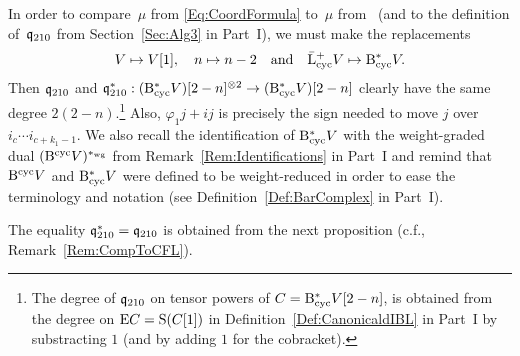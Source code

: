 \documentclass[\MainFolder/Text.tex]{subfiles}
\begin{document}
\begin{Remark}\label{Rem:CompToCFL}
In order to compare~$\mu$ from \eqref{Eq:CoordFormula} to~$\mu$ from~\cite[Section~10]{Cieliebak2015} (and to the definition of~$\mathfrak{q}_{210}$ from Section~\ref{Sec:Alg3} in Part~I), we must make the replacements
\[ V\mapsto V[1], \quad  n \mapsto n - 2\quad\text{and}\quad\bar{\mathrm{L}}^+_{\mathrm{cyc}} V\mapsto \mathrm{B}_{\mathrm{cyc}}^* V. \]
Then $\mathfrak{q}_{210}$ and $\mathfrak{q}^*_{210}: (\mathrm{B}_{\mathrm{cyc}}^* V)[2-n]^{\otimes 2} \rightarrow (\mathrm{B}_{\mathrm{cyc}}^* V)[2-n]$ clearly have the same degree $2(2-n)$.\footnote{The degree of $\mathfrak{q}_{210}$ on tensor powers of $C = \mathrm{B}_{\mathrm{cyc}}^* V [2-n]$, is obtained from the degree on $\mathrm{E} C = \mathrm{S}(C[1])$ in Definition~\ref{Def:CanonicaldIBL} in Part~I by substracting $1$ (and by adding $1$ for the cobracket).} Also, $\varphi_1 j + i j$ is precisely the sign needed to move $j$ over $i_{c}\dotsb i_{c+k_1-1}$. We also recall the identification of $\mathrm{B}_{\mathrm{cyc}}^* V$ with the weight-graded dual $(\mathrm{B}^{\mathrm{cyc}} V)^{*_{\mathrm{wg}}}$ from Remark~\ref{Rem:Identifications} in Part~I and remind that $\mathrm{B}^{\mathrm{cyc}} V$ and $\mathrm{B}_{\mathrm{cyc}}^* V$ were defined to be weight-reduced in order to ease the terminology and notation (see Definition~\ref{Def:BarComplex} in Part~I).
\end{Remark}

The equality $\mathfrak{q}_{210}^*= \mathfrak{q}_{210}$ is obtained from the next proposition (c.f., Remark~\ref{Rem:CompToCFL}).
\end{document}
